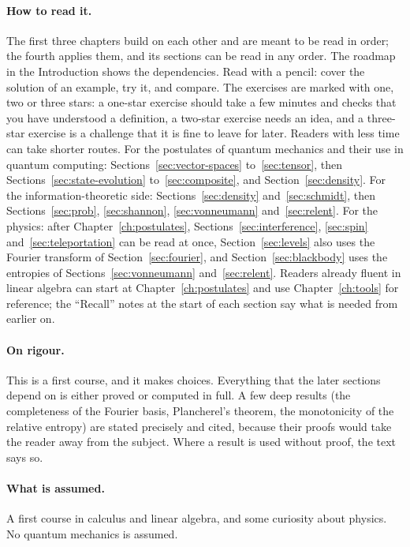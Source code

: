\paragraph{How to read it.}
The first three chapters build on each other and are meant to be read in order; the fourth applies them, and its sections can be read in any order. The roadmap in the Introduction shows the dependencies. Read with a pencil: cover the solution of an example, try it, and compare. The exercises are marked with one, two or three stars: a one-star exercise should take a few minutes and checks that you have understood a definition, a two-star exercise needs an idea, and a three-star exercise is a challenge that it is fine to leave for later.
Readers with less time can take shorter routes. For the postulates of quantum mechanics and their use in quantum computing: Sections~\ref{sec:vector-spaces} to~\ref{sec:tensor}, then Sections~\ref{sec:state-evolution} to~\ref{sec:composite}, and Section~\ref{sec:density}. For the information-theoretic side: Sections~\ref{sec:density} and~\ref{sec:schmidt}, then Sections~\ref{sec:prob}, \ref{sec:shannon}, \ref{sec:vonneumann} and~\ref{sec:relent}. For the physics: after Chapter~\ref{ch:postulates}, Sections~\ref{sec:interference}, \ref{sec:spin} and~\ref{sec:teleportation} can be read at once, Section~\ref{sec:levels} also uses the Fourier transform of Section~\ref{sec:fourier}, and Section~\ref{sec:blackbody} uses the entropies of Sections~\ref{sec:vonneumann} and~\ref{sec:relent}. Readers already fluent in linear algebra can start at Chapter~\ref{ch:postulates} and use Chapter~\ref{ch:tools} for reference; the ``Recall'' notes at the start of each section say what is needed from earlier on.

\paragraph{On rigour.}
This is a first course, and it makes choices. Everything that the later sections depend on is either proved or computed in full. A few deep results (the completeness of the Fourier basis, Plancherel's theorem, the monotonicity of the relative entropy) are stated precisely and cited, because their proofs would take the reader away from the subject. Where a result is used without proof, the text says so.

\paragraph{What is assumed.}
A first course in calculus and linear algebra, and some curiosity about physics. No quantum mechanics is assumed.


